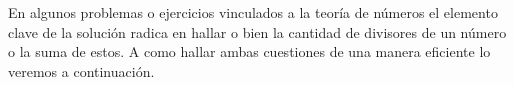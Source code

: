 En algunos problemas o ejercicios vinculados a la teoría de números el elemento clave de la solución radica en hallar o bien la cantidad de divisores de un número o la suma de estos. A como hallar ambas cuestiones de una manera eficiente lo veremos a continuación.